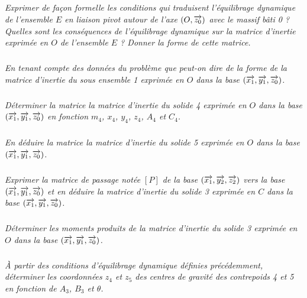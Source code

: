 \documentclass[10pt,fleqn]{article} %
\begin{document}
\begin{multicols}{2}
\subparagraph{}
\textit{Exprimer de façon formelle les conditions qui traduisent l’équilibrage dynamique de l’ensemble $E$ en liaison pivot autour de l’axe $\left(O,\overrightarrow{z_0}\right)$ avec le massif bâti 0 ? Quelles sont les conséquences de l’équilibrage dynamique sur la matrice d’inertie exprimée en $O$ de l’ensemble $E$ ? Donner la forme de cette matrice.}
\ifprof
\begin{corrige}
\end{corrige}\else\fi


\subparagraph{}
\textit{ En tenant compte des données du problème que peut-on dire de la forme de la matrice d’inertie du
sous ensemble 1 exprimée en $O$ dans la base $\left(\overrightarrow{x_1},\overrightarrow{y_1},\overrightarrow{z_0} \right)$.}
\ifprof
\begin{corrige}
\end{corrige}\else\fi


\subparagraph{}
\textit{Déterminer la matrice la matrice d’inertie du solide 4 exprimée en $O$ dans la base $\left(\overrightarrow{x_1},\overrightarrow{y_1},\overrightarrow{z_0} \right)$ en fonction $m_4$, $x_4$, $y_4$, $z_4$, $A_4$ et $C_4$.}
\ifprof
\begin{corrige}
\end{corrige}\else\fi


\subparagraph{}
\textit{En déduire la matrice la matrice d’inertie du solide 5 exprimée en $O$ dans la base $\left(\overrightarrow{x_1},\overrightarrow{y_1},\overrightarrow{z_0} \right)$.
}
\ifprof
\begin{corrige}
\end{corrige}\else\fi


\subparagraph{}
\textit{Exprimer la matrice de passage notée $[P]$ de la base $\left(\overrightarrow{x_1},\overrightarrow{y_2},\overrightarrow{z_2} \right)$ vers la base $\left(\overrightarrow{x_1},\overrightarrow{y_1},\overrightarrow{z_0} \right)$ et en déduire la matrice d’inertie du solide 3 exprimée en $C$ dans la base $\left(\overrightarrow{x_1},\overrightarrow{y_1},\overrightarrow{z_0} \right)$.}
\ifprof
\begin{corrige}
\end{corrige}\else\fi

\subparagraph{}
\textit{Déterminer les moments produits de la matrice d’inertie du solide 3 exprimée en $O$ dans la base $\left(\overrightarrow{x_1},\overrightarrow{y_1},\overrightarrow{z_0} \right)$.}
\ifprof
\begin{corrige}
\end{corrige}\else\fi

\subparagraph{}
\textit{À partir des conditions d’équilibrage dynamique définies précédemment, déterminer les coordonnées
$z_4$ et $z_5$ des centres de gravité des contrepoids 4 et 5 en fonction de $A_3$, $B_3$ et $\theta$.
}
\ifprof
\begin{corrige}
\end{corrige}\else\fi


\end{multicols}
\end{document}
